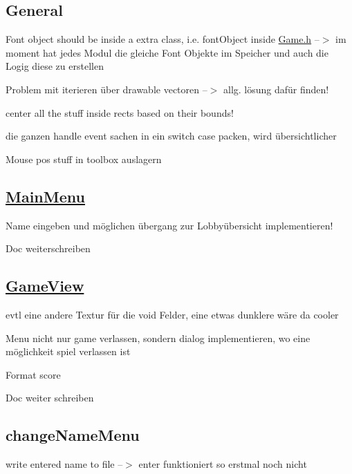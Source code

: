 \subsection*{General}


\begin{DoxyItemize}
\item Font object should be inside a extra class, i.\+e. font\+Object inside \hyperlink{Game_8h}{Game.\+h} --$>$ im moment hat jedes Modul die gleiche Font Objekte im Speicher und auch die Logig diese zu erstellen
\item Problem mit iterieren über drawable vectoren --$>$ allg. lösung dafür finden!
\item center all the stuff inside rects based on their bounds!
\item die ganzen handle event sachen in ein switch case packen, wird übersichtlicher
\item Mouse pos stuff in toolbox auslagern
\end{DoxyItemize}

\subsection*{\hyperlink{classMainMenu}{Main\+Menu}}


\begin{DoxyItemize}
\item Name eingeben und möglichen übergang zur Lobbyübersicht implementieren!
\item Doc weiterschreiben \subsection*{\hyperlink{classGameView}{Game\+View}}
\end{DoxyItemize}


\begin{DoxyItemize}
\item evtl eine andere Textur für die void Felder, eine etwas dunklere wäre da cooler
\item Menu nicht nur game verlassen, sondern dialog implementieren, wo eine möglichkeit spiel verlassen ist
\item Format score
\item Doc weiter schreiben
\end{DoxyItemize}

\subsection*{change\+Name\+Menu}


\begin{DoxyItemize}
\item write entered name to file --$>$ enter funktioniert so erstmal noch nicht 
\end{DoxyItemize}